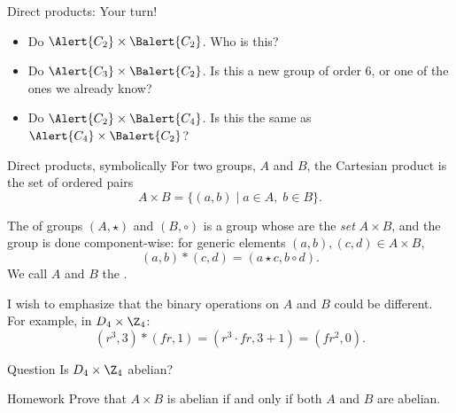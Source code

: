 \documentclass[8pt, handout]{beamer}
\newcommand{\Pause}{}
\begin{document}

\begin{frame}{Direct products: Your turn!}
  \begin{itemize}
    \item Do $\Alert{C_2}\times\Balert{C_2}$. Who is this? \Pause
    \item Do $\Alert{C_3}\times\Balert{C_2}$. Is this a new group of order 6, or one of the ones we already know? \Pause
    \item Do $\Alert{C_2}\times\Balert{C_4}$. Is this the same as $\Alert{C_4}\times\Balert{C_2}$?
  \end{itemize}
\end{frame}


\begin{frame}{Direct products, symbolically}
  For two groups, $A$ and $B$, the Cartesian product is the set of ordered pairs
  \[
  A\times B=\big\{(a,b)\mid a\in A,\;b\in B\big\}.
  \]
  
  \vspace{-2mm}\Pause
  
  \begin{definition}
    The  of groups $(A,\star)$ and $(B, \circ)$ is a group whose  are the \emph{set} $A\times B$, 
    and the group  is done component-wise: \Pause 
    for generic elements $(a,b),(c,d)\in A\times B$,
    \[
    (a,b)*(c,d)=(a\star c,b\circ d).
    \]
    \Pause We call $A$ and $B$ the .
  \end{definition}
  
  \smallskip\Pause
  
  I wish to emphasize that the binary operations on $A$ and $B$ could be different. \Pause 
  For example, in $D_4\times\Z_4$:
  \[
  (r^3,3)*(fr,1)=(r^3\cdot fr,3+1)\Pause=(fr^2,0). 
  \]

  \begin{alertblock}{Question}
    Is $D_4\times \Z_4$ abelian?
  \end{alertblock} \Pause
  \begin{exampleblock}{Homework}
    Prove that $A\times B$ is abelian \alert{if and only if} both $A$ and $B$ are abelian.
  \end{exampleblock}
  
\end{frame}
\end{document}
